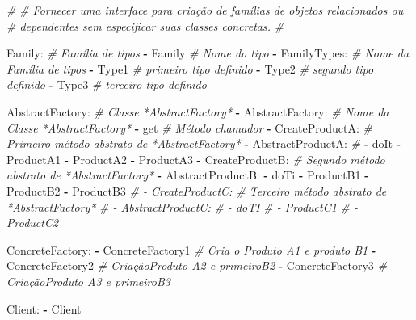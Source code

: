 \documentclass[]{article}
\newenvironment{Shaded}{}{}
\newcommand{\KeywordTok}[1]{\textcolor[rgb]{0.00,0.44,0.13}{\textbf{{#1}}}}
\newcommand{\CommentTok}[1]{\textcolor[rgb]{0.38,0.63,0.69}{\textit{{#1}}}}
\newcommand{\FunctionTok}[1]{\textcolor[rgb]{0.02,0.16,0.49}{{#1}}}
\newcommand{\NormalTok}[1]{{#1}}
\begin{document}
\begin{Shaded}
\begin{Highlighting}[]
\CommentTok{#}
\CommentTok{# Fornecer uma interface para criação de famílias de objetos relacionados ou}
\CommentTok{# dependentes sem especificar suas classes concretas.}
\CommentTok{#}

\FunctionTok{Family:}                      \CommentTok{# Família de tipos}
\KeywordTok{-} \NormalTok{Family                     }\CommentTok{# Nome do tipo}
\KeywordTok{-} \FunctionTok{FamilyTypes:}               \CommentTok{# Nome da Família de tipos}
    \KeywordTok{-} \NormalTok{Type1                  }\CommentTok{# primeiro tipo definido}
    \KeywordTok{-} \NormalTok{Type2                  }\CommentTok{# segundo tipo definido}
    \KeywordTok{-} \NormalTok{Type3                  }\CommentTok{# terceiro tipo definido}

\FunctionTok{AbstractFactory:}            \CommentTok{# Classe *AbstractFactory*}
\KeywordTok{-} \FunctionTok{AbstractFactory:}          \CommentTok{# Nome da Classe *AbstractFactory*}
    \KeywordTok{-} \NormalTok{get                   }\CommentTok{# Método chamador}
    \KeywordTok{-} \FunctionTok{CreateProductA:}       \CommentTok{# Primeiro método abstrato de *AbstractFactory*}
        \KeywordTok{-} \FunctionTok{AbstractProductA:} \CommentTok{#}
            \KeywordTok{-} \NormalTok{doIt}
            \KeywordTok{-} \NormalTok{ProductA1}
            \KeywordTok{-} \NormalTok{ProductA2}
            \KeywordTok{-} \NormalTok{ProductA3}
    \KeywordTok{-} \FunctionTok{CreateProductB:}       \CommentTok{# Segundo método abstrato de *AbstractFactory*}
        \KeywordTok{-} \FunctionTok{AbstractProductB:}
            \KeywordTok{-} \NormalTok{doTi}
            \KeywordTok{-} \NormalTok{ProductB1}
            \KeywordTok{-} \NormalTok{ProductB2}
            \KeywordTok{-} \NormalTok{ProductB3}
\CommentTok{#    - CreateProductC:       # Terceiro método abstrato de *AbstractFactory*}
\CommentTok{#            - AbstractProductC:}
\CommentTok{#                - doTI}
\CommentTok{#                - ProductC1}
\CommentTok{#                - ProductC2}

\FunctionTok{ConcreteFactory:}
\KeywordTok{-} \NormalTok{ConcreteFactory1           }\CommentTok{# Cria o Produto A1 e produto B1}
\KeywordTok{-} \NormalTok{ConcreteFactory2           }\CommentTok{# CriaçãoProduto A2 e primeiroB2}
\KeywordTok{-} \NormalTok{ConcreteFactory3           }\CommentTok{# CriaçãoProduto A3 e primeiroB3}

\FunctionTok{Client:}
\KeywordTok{-} \NormalTok{Client}
\end{Highlighting}
\end{Shaded}
\end{document}
